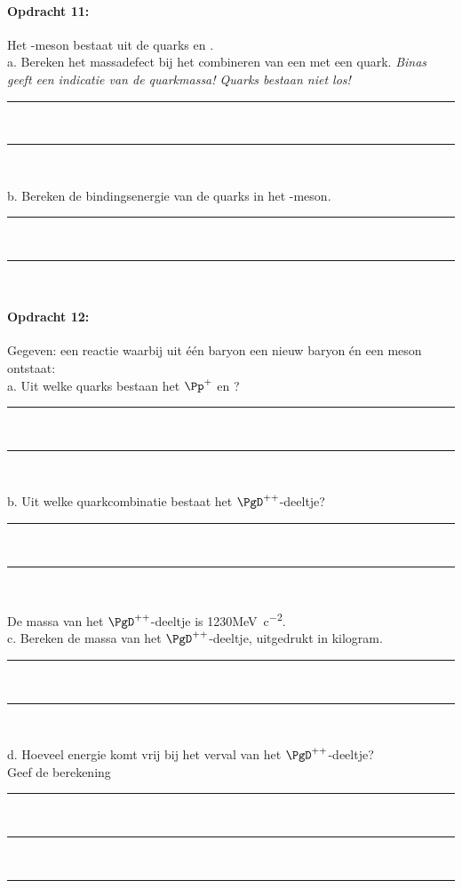 \paragraph{Opdracht 11:}
Het \Ppiplus-meson bestaat uit de quarks \Pup en \APdown.\\
a. Bereken het massadefect bij het combineren van een \Pup met een \APdown quark.
\emph{Binas geeft een indicatie van de quarkmassa! Quarks bestaan niet los!}
\begin{center}
    \rule{\textwidth}{0.3mm}\\
    \rule{\textwidth}{0.3mm}\\
\end{center}
b. Bereken de bindingsenergie van de quarks in het \Ppiplus-meson.
\begin{center}
    \rule{\textwidth}{0.3mm}\\
    \rule{\textwidth}{0.3mm}\\
\end{center}


\paragraph{Opdracht 12:}
Gegeven: een reactie waarbij uit één baryon een nieuw baryon én een meson ontstaat:
\ce{\PgD^{++} -> \Pp^+ + \Ppiplus }\\
a. Uit welke quarks bestaan het $\Pp^+$ en \Ppiplus?
\begin{center}
    \rule{\textwidth}{0.3mm}\\
    \rule{\textwidth}{0.3mm}\\
\end{center}
b. Uit welke quarkcombinatie bestaat het $\PgD^{++}$-deeltje?
\begin{center}
    \rule{\textwidth}{0.3mm}\\
    \rule{\textwidth}{0.3mm}\\
\end{center}
De massa van het $\PgD^{++}$-deeltje is 1230\si{MeV.c^{-2}}.\\
c. Bereken de massa van het $\PgD^{++}$-deeltje, uitgedrukt in kilogram.
\begin{center}
    \rule{\textwidth}{0.3mm}\\
    \rule{\textwidth}{0.3mm}\\
\end{center}
d. Hoeveel energie komt vrij bij het verval van het $\PgD^{++}$-deeltje? \\
Geef de berekening
\begin{center}
    \rule{\textwidth}{0.3mm}\\
    \rule{\textwidth}{0.3mm}\\
    \rule{\textwidth}{0.3mm}\\
\end{center}

